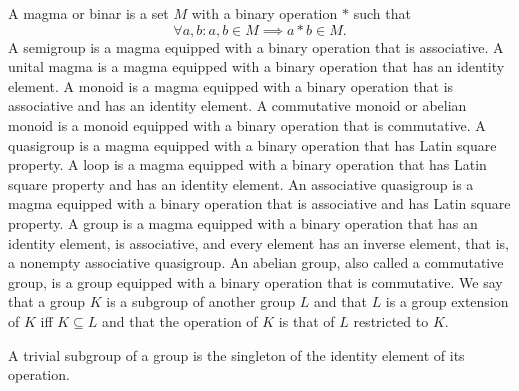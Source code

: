 \documentclass[a4paper,12pt]{article}
\begin{document}
\eit
{}
A magma or binar is a set $M$ with a binary operation $*$ such that
\[\forall a,b\colon a,b\in M\implies a*b\in M.\]
A semigroup is a magma equipped with a binary operation that is associative.
A unital magma is a magma equipped with a binary operation that has an identity element.
A monoid is a magma equipped with a binary operation that is associative and has an identity element.
A commutative monoid or abelian monoid is a monoid equipped with a binary operation that is commutative.
A quasigroup is a magma equipped with a binary operation that has Latin square property.
A loop is a magma equipped with a binary operation that has Latin square property and has an identity element.
An associative quasigroup is a magma equipped with a binary operation that is associative and has Latin square property.
A group is a magma equipped with a binary operation that has an identity element, is associative, and every element has an inverse element, that is, a nonempty associative quasigroup.
An abelian group, also called a commutative group, is a group equipped with a binary operation that is commutative.
We say that a group $K$ is a subgroup of another group $L$ and that $L$ is a group extension of $K$ iff $K\subseteq L$ and that the operation of $K$ is that of $L$ restricted to $K$.

A trivial subgroup of a group is the singleton of the identity element of its operation.
\end{document}
